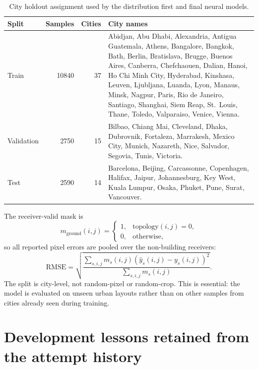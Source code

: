\begin{table}[htbp]
\centering
\scriptsize
\caption{City holdout assignment used by the distribution first and final neural models.}
\label{tab:split_city_assignment}
\begin{tabularx}{\textwidth}{lrrX}
\toprule
Split & Samples & Cities & City names \\
\midrule
Train & 10840 & 37 & Abidjan, Abu Dhabi, Alexandria, Antigua Guatemala,
Athens, Bangalore, Bangkok, Bath, Berlin, Bratislava, Brugge, Buenos Aires,
Canberra, Chefchaouen, Dalian, Hanoi, Ho Chi Minh City, Hyderabad, Kinshasa,
Leuven, Ljubljana, Luanda, Lyon, Manaus, Minsk, Nagpur, Paris,
Rio de Janeiro, Santiago, Shanghai, Siem Reap, St.~Louis, Thane, Toledo,
Valparaiso, Venice, Vienna. \\
Validation & 2750 & 15 & Bilbao, Chiang Mai, Cleveland, Dhaka, Dubrovnik,
Fortaleza, Marrakesh, Mexico City, Munich, Nazareth, Nice, Salvador, Segovia,
Tunis, Victoria. \\
Test & 2590 & 14 & Barcelona, Beijing, Carcassonne, Copenhagen, Halifax,
Jaipur, Johannesburg, Key West, Kuala Lumpur, Osaka, Phuket, Pune, Surat,
Vancouver. \\
\bottomrule
\end{tabularx}
\end{table}

The receiver-valid mask is
\begin{equation}
  m_{\mathrm{ground}}(i,j)=
  \begin{cases}
    1,& \mathrm{topology}(i,j)=0,\\
    0,& \mathrm{otherwise},
  \end{cases}
  \label{eq:ground_mask}
\end{equation}
so all reported pixel errors are pooled over the non-building receivers:
\begin{equation}
  \mathrm{RMSE}
  =
  \sqrt{
  \frac{\sum_{s,i,j} m_s(i,j)(\hat y_s(i,j)-y_s(i,j))^2}
       {\sum_{s,i,j} m_s(i,j)}
  }.
  \label{eq:rmse}
\end{equation}
The split is city-level, not random-pixel or random-crop. This is essential:
the model is evaluated on unseen urban layouts rather than on other samples
from cities already seen during training.

\section{Development lessons retained from the attempt history}

